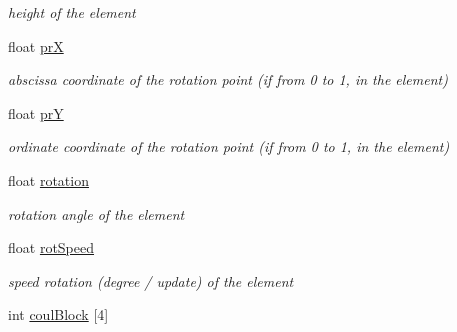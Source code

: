 \begin{DoxyCompactItemize}
\begin{DoxyCompactList}\small\item\em height of the element \end{DoxyCompactList}\item 
float \hyperlink{structElementSDL2_a9b522d7b8bf6b476d142fd0058aff66c}{prX}\hypertarget{structElementSDL2_a9b522d7b8bf6b476d142fd0058aff66c}{}\label{structElementSDL2_a9b522d7b8bf6b476d142fd0058aff66c}

\begin{DoxyCompactList}\small\item\em abscissa coordinate of the rotation point (if from 0 to 1, in the element) \end{DoxyCompactList}\item 
float \hyperlink{structElementSDL2_a23b79d2468ca18e33071cd137f6961c6}{prY}\hypertarget{structElementSDL2_a23b79d2468ca18e33071cd137f6961c6}{}\label{structElementSDL2_a23b79d2468ca18e33071cd137f6961c6}

\begin{DoxyCompactList}\small\item\em ordinate coordinate of the rotation point (if from 0 to 1, in the element) \end{DoxyCompactList}\item 
float \hyperlink{structElementSDL2_a8bbd5c157ceaba03f33b77e71daa7a79}{rotation}\hypertarget{structElementSDL2_a8bbd5c157ceaba03f33b77e71daa7a79}{}\label{structElementSDL2_a8bbd5c157ceaba03f33b77e71daa7a79}

\begin{DoxyCompactList}\small\item\em rotation angle of the element \end{DoxyCompactList}\item 
float \hyperlink{structElementSDL2_a46a53dcb3d0d119e5df7cd276de2c4ae}{rot\+Speed}\hypertarget{structElementSDL2_a46a53dcb3d0d119e5df7cd276de2c4ae}{}\label{structElementSDL2_a46a53dcb3d0d119e5df7cd276de2c4ae}

\begin{DoxyCompactList}\small\item\em speed rotation (degree / update) of the element \end{DoxyCompactList}\item 
int \hyperlink{structElementSDL2_a527fdb85c7fa55880dfcd9ddfdd4e0b9}{coul\+Block} \mbox{[}4\mbox{]}\hypertarget{structElementSDL2_a527fdb85c7fa55880dfcd9ddfdd4e0b9}{}\label{structElementSDL2_a527fdb85c7fa55880dfcd9ddfdd4e0b9}


\end{DoxyCompactItemize}
